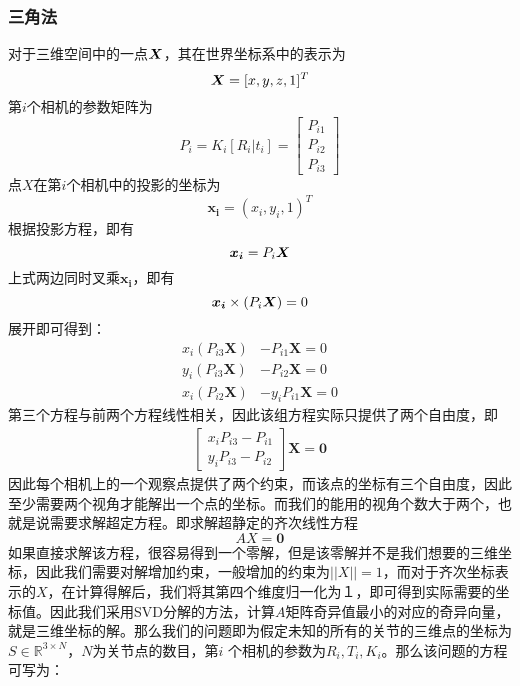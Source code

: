 \subsubsection{三角法}
对于三维空间中的一点${\bm{X}}$，其在世界坐标系中的表示为
\begin{equation}
    {\bm{X}} = [x,y,z,1]^T
\end{equation}
第$i$个相机的参数矩阵为
\begin{equation}
    P_i = K_i[R_i | t_i] = \left[ \begin{array}{c}
            P_{i1} \\ P_{i2} \\ P_{i3}
        \end{array}\right]
\end{equation}
点$X$在第$i$个相机中的投影的坐标为
\begin{equation}
    \bm{x_i} = (x_i, y_i, 1)^T
\end{equation}
根据投影方程，即有
\begin{equation}
    \bm{x_i} = P_i{\bm{X}}
\end{equation}
上式两边同时叉乘$\bm{x_i}$，即有
\begin{equation}
    \bm{x_i} \times (P_i{\bm{X}}) = 0
\end{equation}
展开即可得到：
\begin{align}
    x_i(P_{i3}\bm{X}) & - P_{i1}\bm{X} = 0   \\
    y_i(P_{i3}\bm{X}) & - P_{i2}\bm{X}= 0    \\
    x_i(P_{i2}\bm{X}) & - y_iP_{i1}\bm{X}= 0
\end{align}
第三个方程与前两个方程线性相关，因此该组方程实际只提供了两个自由度，即
\begin{align}
    \left[ \begin{array}{c}
            x_iP_{i3} - P_{i1} \\ y_iP_{i3} - P_{i2}
        \end{array}\right]\bm{X} = \bm{0}
\end{align}
因此每个相机上的一个观察点提供了两个约束，而该点的坐标有三个自由度，因此至少需要两个视角才能解出一个点的坐标。而我们的能用的视角个数大于两个，也就是说需要求解超定方程。即求解超静定的齐次线性方程
\begin{equation}
    AX = \bm{0}
\end{equation}
如果直接求解该方程，很容易得到一个零解，但是该零解并不是我们想要的三维坐标，因此我们需要对解增加约束，一般增加的约束为\(|| X || = 1\)，而对于齐次坐标表示的\(X\)，在计算得解后，我们将其第四个维度归一化为１，即可得到实际需要的坐标值。因此我们采用SVD分解的方法，计算$A$矩阵奇异值最小的对应的奇异向量，就是三维坐标的解。那么我们的问题即为假定未知的所有的关节的三维点的坐标为$S\in \mathbb{R}^{3\times N}$，$N$为关节点的数目，第$i$ 个相机的参数为$R_i,T_i,K_i$。那么该问题的方程可写为：

